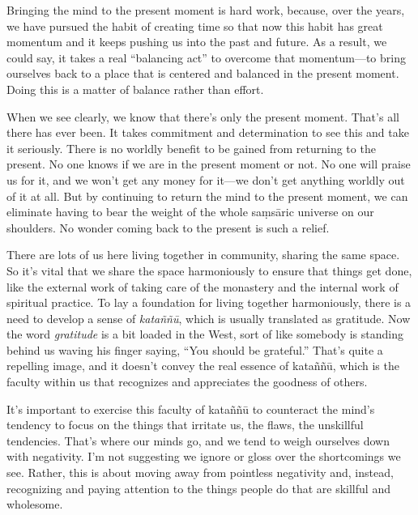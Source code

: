 Bringing the mind to the present moment is hard work, because, over the 
years, we have pursued the habit of creating time so that now this 
habit has great momentum and it keeps pushing us into the past and 
future. As a result, we could say, it takes a real ``balancing act'' to 
overcome that momentum---to bring ourselves back to a place that is 
centered and balanced in the present moment. Doing this is a matter of 
balance rather than effort.

When we see clearly, we know that there's only the present moment. 
That's all there has ever been. It takes commitment and determination 
to see this and take it seriously. There is no worldly benefit to be 
gained from returning to the present. No one knows if we are in the 
present moment or not. No one will praise us for it, and we won't get 
any money for it---we don't get anything worldly out of it at all. But 
by continuing to return the mind to the present moment, we can 
eliminate having to bear the weight of the whole saṃsāric universe 
on our shoulders. No wonder coming back to the present is such a relief.


There are lots of us here living together in community, sharing the 
same space. So it's vital that we share the space harmoniously to 
ensure that things get done, like the external work of taking care of 
the monastery and the internal work of spiritual practice. To lay a 
foundation for living together harmoniously, there is a need to develop 
a sense of \emph{kataññū}, which is usually translated as gratitude. 
Now the word \emph{gratitude} is a bit loaded in the West, sort of like 
somebody is standing behind us waving his finger saying, ``You should 
be grateful.'' That's quite a repelling image, and it doesn't convey 
the real essence of kataññū, which is the faculty within us that 
recognizes and appreciates the goodness of others.

It's important to exercise this faculty of kataññū to counteract the 
mind's tendency to focus on the things that irritate us, the flaws, the 
unskillful tendencies. That's where our minds go, and we tend to weigh 
ourselves down with negativity. I'm not suggesting we ignore or gloss 
over the shortcomings we see. Rather, this is about moving away from 
pointless negativity and, instead, recognizing and paying attention to 
the things people do that are skillful and wholesome.

